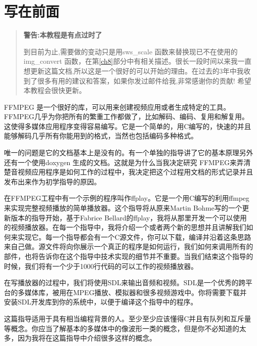 ﻿\chapter*{写在前面}
\begin{quote}
\textbf{警告:本教程是有点过时了}

到目前为止,需要做的变动只是用sws_scale 函数来替换现已不在使用的 img_convert 函数，在第\ref{ch8}部分中有相关描述。很长一段时间以来我一直想更新这篇文档,所以这是一个很好的可以开始的理由。在过去的3年中我收到了很多有用的建议和答案，如果你发过邮件给我,非常感谢你的贡献! 希望本教程会很快更新。
\end{quote}

FFMPEG 是一个很好的库，可以用来创建视频应用或者生成特定的工具。FFMPEG几乎为你把所有的繁重工作都做了，比如解码、编码、复用和解复用。这使得多媒体应用程序变得容易编写。它是一个简单的，用C编写的，快速的并且能够解码几乎所有你能用到的格式，当然也包括编码多种格式。

唯一的问题是它的文档基本上是没有的。有一个单独的指导讲了它的基本原理另外还有一个使用doxygen 生成的文档。这就是为什么当我决定研究 FFMPEG来弄清楚音视频应用程序是如何工作的过程中，我决定把这个过程用文档的形式记录并且发布出来作为初学指导的原因。

在FFMPEG工程中有一个示例的程序叫作ffplay。它是一个用C编写的利用ffmpeg来实现完整视频播放的简单播放器。这个指导将从原来Martin Bohme写的一个更新版本的指导开始，基于Fabrice Bellard的ffplay，我将从那里开发一个可以使用的视频播放器。在每一个指导中，我将介绍一个或者两个新的思想并且讲解我们如何来实现它。每一个指导都会有一个C源文件，你可以下载，编译并沿着这条思路来自己做。源文件将向你展示一个真正的程序是如何运行，我们如何来调用所有的部件，也将告诉你在这个指导中技术实现的细节并不重要。当我们结束这个指导的时候，我们将有一个少于1000行代码的可以工作的视频播放器。

在写播放器的过程中，我们将使用SDL来输出音频和视频。SDL是一个优秀的跨平台的多媒体库，被用在MPEG播放、模拟器和很多视频游戏中。你将需要下载并安装SDL开发库到你的系统中，以便于编译这个指导中的程序。

这篇指导适用于具有相当编程背景的人。至少至少应该懂得C并且有队列和互斥量等概念。你应当了解基本的多媒体中的像波形一类的概念，但是你不必知道的太多，因为我将在这篇指导中介绍很多这样的概念。
